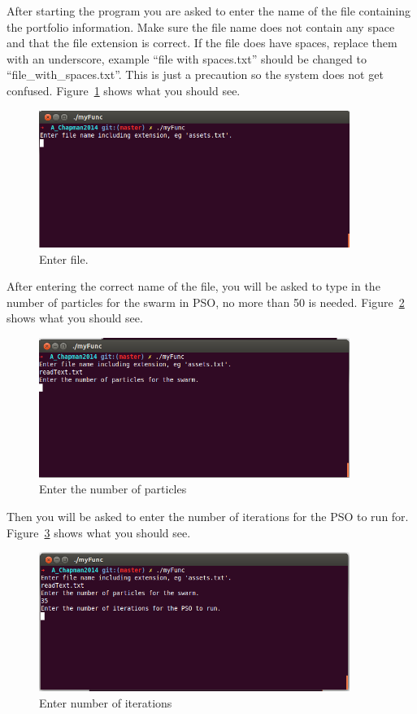\documentclass{pdfmx4020}
\begin{document}
After starting the program you are asked to enter the name of the file containing the portfolio information. Make sure the file name does not contain any space and that the file extension is correct. If the file does have spaces, replace them with an underscore, example ``file with spaces.txt'' should be changed to ``file\_with\_spaces.txt''. This is just a precaution so the system does not get confused. Figure~\ref{fig:asset_file} shows what you should see. 
\begin{figure}[H]
  \centering
    \includegraphics[width=0.9\textwidth]{asset_file}
  \caption{Enter file.}
  \label{fig:asset_file}
\end{figure}
After entering the correct name of the file, you will be asked to type in the number of particles for the swarm in PSO, no more than 50 is needed. Figure~\ref{fig:np} shows what you should see. 
\begin{figure}[H]
  \centering
    \includegraphics[width=0.9\textwidth]{np}
  \caption{Enter the number of particles}
  \label{fig:np}
\end{figure}
Then you will be asked to enter the number of iterations for the PSO to run for. Figure~\ref{fig:nit} shows what you should see. 
\begin{figure}[H]
  \centering
    \includegraphics[width=0.9\textwidth]{nit}
  \caption{Enter number of iterations}
  \label{fig:nit}
\end{figure}
\end{document}
